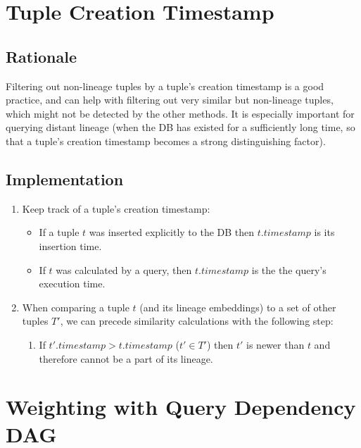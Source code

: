 \section{Tuple Creation Timestamp}
\subsection{Rationale} Filtering out non-lineage tuples by a tuple's creation timestamp is a good practice, and can help with filtering out very similar but non-lineage tuples, which might not be detected by the other methods. It is especially important for querying distant lineage (when the DB has existed for a sufficiently long time, so that a tuple's creation timestamp becomes a strong distinguishing factor).\\

\subsection{Implementation} 
\begin{enumerate}
    \item Keep track of a tuple's creation timestamp:
    \begin{itemize}
        \item If a tuple $t$ was inserted explicitly to the DB then $t.timestamp$ is its insertion time.
        \item If $t$ was calculated by a query, then $t.timestamp$ is the the query's execution time.
    \end{itemize}
    \item When comparing a tuple $t$ (and its lineage embeddings) to a set of other tuples $T'$, we can precede similarity calculations with the following step:
    \begin{enumerate}
        \item If $t'.timestamp > t.timestamp$ ($t' \in T'$) then $t'$ is newer than $t$ and therefore cannot be a part of its lineage.
    \end{enumerate}
\end{enumerate}


\section{Weighting with Query Dependency DAG}
